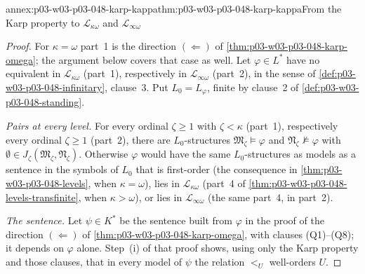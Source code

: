 \begin{annexitem}{annex:p03-w03-p03-048-karp-kappa}{thm:p03-w03-p03-048-karp-kappa}{From the Karp property to \(\mathcal L_{\kappa\omega}\) and \(\mathcal L_{\infty\omega}\)}
\begin{proof}
For \(\kappa=\omega\) part~1 is the direction \((\Leftarrow)\) of
\cref{thm:p03-w03-p03-048-karp-omega}; the argument below covers that case
as well.  Let \(\varphi\in L^{\ast}\) have no equivalent in
\(\mathcal L_{\kappa\omega}\) (part~1), respectively in
\(\mathcal L_{\infty\omega}\) (part~2), in the sense of
\cref{def:p03-w03-p03-048-infinitary}, clause~3.  Put \(L_0=L_\varphi\),
finite by clause~2 of \cref{def:p03-w03-p03-048-standing}.

\emph{Pairs at every level.}  For every ordinal \(\zeta\geq1\) with
\(\zeta<\kappa\) (part~1), respectively every ordinal \(\zeta\geq1\)
(part~2), there are \(L_0\)-structures \(\mathfrak M_\zeta\models\varphi\)
and \(\mathfrak N_\zeta\not\models\varphi\) with \(\emptyset\in
J_\zeta(\mathfrak M_\zeta,\mathfrak N_\zeta)\).  Otherwise
\(\varphi\) would have the same \(L_0\)-structures as models as a sentence
in the symbols of \(L_0\) that is first-order (the consequence in
\cref{thm:p03-w03-p03-048-levels}, when \(\kappa=\omega\)), lies in
\(\mathcal L_{\kappa\omega}\) (part~4 of
\cref{thm:p03-w03-p03-048-levels-transfinite}, when \(\kappa>\omega\)), or
lies in \(\mathcal L_{\infty\omega}\) (the same part~4, in part~2).

\emph{The sentence.}  Let \(\psi\in K^{\ast}\) be the sentence built from
\(\varphi\) in the proof of the direction \((\Leftarrow)\) of
\cref{thm:p03-w03-p03-048-karp-omega}, with clauses (Q1)--(Q8); it depends
on \(\varphi\) alone.  Step~(i) of that proof shows, using only the Karp
property and those clauses, that in every model of \(\psi\) the relation
\(<_U\) well-orders \(U\).


\end{proof}
\end{annexitem}
